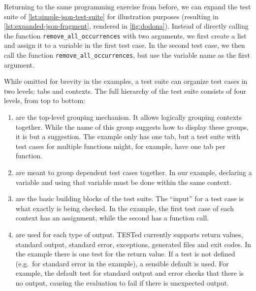 \documentclass[../main]{subfiles}
\begin{document}
Returning to the same programming exercise from before, we can expand the test suite of \cref{lst:simple-json-test-suite} for illustration purposes (resulting in \cref{lst:expanded-json-fragment}, rendered in \cref{fig:dodona}).
Instead of directly calling the function \texttt{remove_all_occurrences} with two arguments, we first create a list and assign it to a variable in the first test case.
In the second test case, we then call the function \texttt{remove_all_occurrences}, but use the variable name as the first argument.

While omitted for brevity in the examples, a test suite can organize test cases in two levels: tabs and contexts.
The full hierarchy of the test suite consists of four levels, from top to bottom:

\begin{enumerate}[noitemsep]
    \item {} are the top-level grouping mechanism.
          It allows logically grouping contexts together.
          While the name of this group suggests how to display these groups, it is but a suggestion.
          The example only has one tab, but a test suite with test cases for multiple functions might, for example, have one tab per function.
    \item {} are meant to group dependent test cases together.
          In our example, declaring a variable and using that variable must be done within the same context.
    \item {} are the basic building blocks of the test suite.
          The ``input'' for a test case is what exactly is being checked.
          In the example, the first test case of each context has an assignment, while the second has a function call.
    \item {} are used for each type of output.
          TESTed currently supports return values, standard output, standard error, exceptions, generated files and exit codes.
          In the example there is one test for the return value.
          If a test is not defined (e.g.\ for standard error in the example), a sensible default is used.
          For example, the default test for standard output and error checks that there is no output, causing the evaluation to fail if there is unexpected output.
\end{enumerate}
\end{document}
